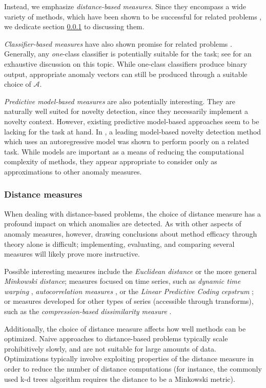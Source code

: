 Instead, we emphasize \emph{distance-based measures}. Since they encompass a wide variety of methods, which have been shown to be successful for related problems \cite{chandola3}, we dedicate section \ref{sect:distance_mezurez} to discussing them.

\emph{Classifier-based measures} have also shown promise for related problems \cite{chandola3}. Generally, any \emph{one}-class classifier is potentially suitable for the task; see \cite{classification} for an exhaustive discussion on this topic. While one-class classifiers produce binary output, appropriate anomaly vectors can still be produced through a suitable choice of $\mathcal{A}$.

\emph{Predictive model-based measures} are also potentially interesting. They are naturally well suited for novelty detection, since they necessarily implement a novelty context. However, existing predictive model-based approaches seem to be lacking for the task at hand. In \cite{chandola3}, a leading model-based novelty detection method \cite{perkins2} which uses an autoregressive model was shown to perform poorly on a related task. While models are important as a means of reducing the computational complexity of methods, they appear appropriate to consider only as approximations to other anomaly measures.

\subsubsection{Distance measures}
\label{sect:distance_mezurez}

When dealing with distance-based problems, the choice of distance measure has a profound impact on which anomalies are detected. As with other aspects of anomaly measures, however, drawing conclusions about method efficacy through theory alone is difficult; implementing, evaluating, and comparing several measures will likely prove more instructive.

Possible interesting measures include the \emph{Euclidean distance} or the more general \emph{Minkowski distance}; measures focused on time series, such as \emph{dynamic time warping} \cite{dtw}, \emph{autocorrelation measures} \cite{autocorrelation}, or the \emph{Linear Predictive Coding cepstrum} \cite{cepstrum}; or measures developed for other types of series (accessible through transforms), such as the \emph{compression-based dissimilarity measure} \cite{keogh2}.

Additionally, the choice of distance measure affects how well methods can be optimized. Naive approaches to distance-based problems typically scale prohibitively slowly, and are not suitable for large amounts of data. Optimizations typically involve exploiting properties of the distance measure in order to reduce the number of distance computations (for instance, the commonly used k-d trees algorithm requires the distance to be a Minkowski metric).


